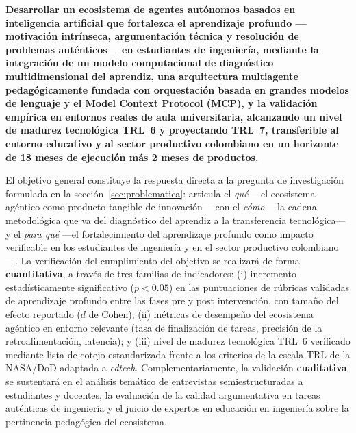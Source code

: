 
\noindent\textbf{Desarrollar un ecosistema de agentes autónomos basados en inteligencia artificial que fortalezca el aprendizaje profundo —motivación intrínseca, argumentación técnica y resolución de problemas auténticos— en estudiantes de ingeniería, mediante la integración de un modelo computacional de diagnóstico multidimensional del aprendiz, una arquitectura multiagente pedagógicamente fundada con orquestación basada en grandes modelos de lenguaje y el Model Context Protocol (MCP), y la validación empírica en entornos reales de aula universitaria, alcanzando un nivel de madurez tecnológica TRL~6 y proyectando TRL~7, transferible al entorno educativo y al sector productivo colombiano en un horizonte de 18 meses de ejecución más 2 meses de productos.}

\bigskip

\noindent El objetivo general constituye la respuesta directa a la pregunta de investigación formulada en la sección~\ref{sec:problematica}: articula el \emph{qué} —el ecosistema agéntico como producto tangible de innovación— con el \emph{cómo} —la cadena metodológica que va del diagnóstico del aprendiz a la transferencia tecnológica— y el \emph{para qué} —el fortalecimiento del aprendizaje profundo como impacto verificable en los estudiantes de ingeniería y en el sector productivo colombiano—. La verificación del cumplimiento del objetivo se realizará de forma \textbf{cuantitativa}, a través de tres familias de indicadores: (i) incremento estadísticamente significativo ($p < 0.05$) en las puntuaciones de rúbricas validadas de aprendizaje profundo entre las fases pre y post intervención, con tamaño del efecto reportado ($d$ de Cohen); (ii) métricas de desempeño del ecosistema agéntico en entorno relevante (tasa de finalización de tareas, precisión de la retroalimentación, latencia); y (iii) nivel de madurez tecnológica TRL~6 verificado mediante lista de cotejo estandarizada frente a los criterios de la escala TRL de la NASA/DoD adaptada a \emph{edtech}. Complementariamente, la validación \textbf{cualitativa} se sustentará en el análisis temático de entrevistas semiestructuradas a estudiantes y docentes, la evaluación de la calidad argumentativa en tareas auténticas de ingeniería y el juicio de expertos en educación en ingeniería sobre la pertinencia pedagógica del ecosistema.

